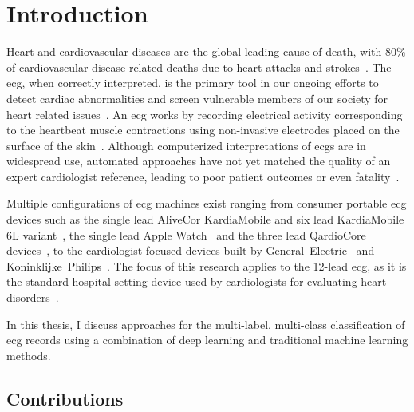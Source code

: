 \documentclass[\main/thesis.tex]{subfiles}
\begin{document}
\chapter{Introduction}

Heart and cardiovascular diseases are the global leading cause of death, with 80\% of cardiovascular disease related deaths due to heart attacks and strokes~\cite{doi:10.1161/CIR.0000000000000757}.
The \acrfull{ecg}, when correctly interpreted, is the primary tool in our ongoing efforts to detect cardiac abnormalities and screen vulnerable members of our society for heart related issues~\cite{SMULYAN2019153}.
An \gls{ecg} works by recording electrical activity corresponding to the heartbeat muscle contractions using non-invasive electrodes placed on the surface of the skin~\cite{bonow2011braunwald}.
Although computerized interpretations of \gls{ecg}s are in widespread use, automated approaches have not yet matched the quality of an expert cardiologist reference, leading to poor patient outcomes or even fatality~\cite{BREEN2019}.

Multiple configurations of \gls{ecg} machines exist ranging from consumer portable \gls{ecg} devices such as the single lead AliveCor KardiaMobile and six lead KardiaMobile 6L variant~\cite{alivecor-website}, the single lead Apple Watch~\cite{apple-watch} and the three lead QardioCore devices~\cite{quardiocore-website}, to the cardiologist focused devices built by General~Electric~\cite{generalelectric-website} and Koninklijke~Philips~\cite{koninklijkephilips-website}.
The focus of this research applies to the 12-lead \gls{ecg}, as it is the standard hospital setting device used by cardiologists for evaluating heart disorders~\cite{kligfield_paul_recommendations_2007}.

In this thesis, I discuss approaches for the multi-label, multi-class classification of \gls{ecg} records using a combination of deep learning and traditional machine learning methods.

\section{Contributions}
\end{document}
